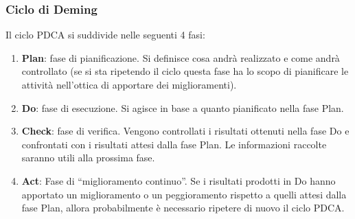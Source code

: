 \subsubsection{Ciclo di Deming} \label{AppPDCA}
Il ciclo PDCA si suddivide nelle seguenti 4 fasi:
\begin{enumerate}
\item \textbf{Plan}: fase di pianificazione. Si definisce cosa andrà realizzato e come andrà controllato (se si sta ripetendo il ciclo questa fase ha lo scopo di pianificare le attività nell'ottica di apportare dei miglioramenti).
\item \textbf{Do}: fase di esecuzione. Si agisce in base a quanto pianificato nella fase Plan.
\item \textbf{Check}: fase di verifica. Vengono controllati i risultati ottenuti nella fase Do e confrontati con i risultati attesi dalla fase Plan. Le informazioni raccolte saranno utili alla prossima fase.
\item \textbf{Act}: Fase di “miglioramento continuo”. Se i risultati prodotti in Do hanno apportato un miglioramento o un peggioramento rispetto a quelli attesi dalla fase Plan, allora probabilmente è necessario ripetere di nuovo il ciclo PDCA.
\end{enumerate}
